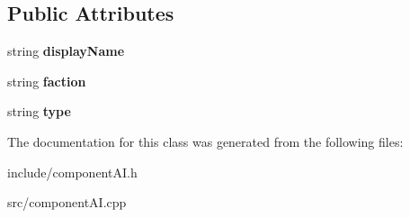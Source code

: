 \subsection*{\-Public \-Attributes}
\begin{DoxyCompactItemize}
\item 
\hypertarget{classComponentTemplateAI_a2a72424bd7890520a129f1820d6f3157}{
string {\bfseries display\-Name}}
\label{dc/d6b/classComponentTemplateAI_a2a72424bd7890520a129f1820d6f3157}

\item 
\hypertarget{classComponentTemplateAI_afaf9b9620aab7bd0bc1e6b59070eede2}{
string {\bfseries faction}}
\label{dc/d6b/classComponentTemplateAI_afaf9b9620aab7bd0bc1e6b59070eede2}

\item 
\hypertarget{classComponentTemplateAI_a19ed90d3697b05701bad1d77d4d873ad}{
string {\bfseries type}}
\label{dc/d6b/classComponentTemplateAI_a19ed90d3697b05701bad1d77d4d873ad}

\end{DoxyCompactItemize}


\-The documentation for this class was generated from the following files\-:\begin{DoxyCompactItemize}
\item 
include/component\-A\-I.\-h\item 
src/component\-A\-I.\-cpp\end{DoxyCompactItemize}
